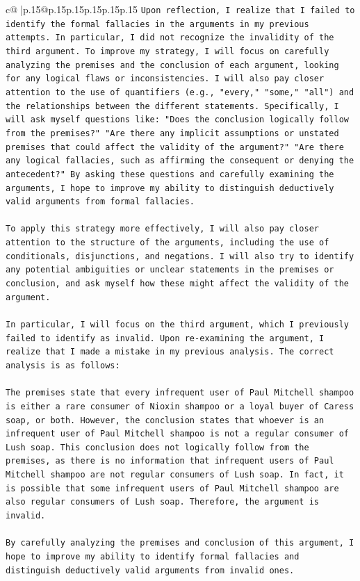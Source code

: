 \documentclass{article}
\begin{document}
{\begin{supertabular}{c@{$\;$}|p{.15\linewidth}@{}p{.15\linewidth}p{.15\linewidth}p{.15\linewidth}p{.15\linewidth}p{.15\linewidth}}
{{{\texttt{Upon reflection, I realize that I failed to identify the formal fallacies in the arguments in my previous attempts. In particular, I did not recognize the invalidity of the third argument. To improve my strategy, I will focus on carefully analyzing the premises and the conclusion of each argument, looking for any logical flaws or inconsistencies. I will also pay closer attention to the use of quantifiers (e.g., "every," "some," "all") and the relationships between the different statements. Specifically, I will ask myself questions like: "Does the conclusion logically follow from the premises?" "Are there any implicit assumptions or unstated premises that could affect the validity of the argument?" "Are there any logical fallacies, such as affirming the consequent or denying the antecedent?" By asking these questions and carefully examining the arguments, I hope to improve my ability to distinguish deductively valid arguments from formal fallacies.} \\
\\ 
\texttt{To apply this strategy more effectively, I will also pay closer attention to the structure of the arguments, including the use of conditionals, disjunctions, and negations. I will also try to identify any potential ambiguities or unclear statements in the premises or conclusion, and ask myself how these might affect the validity of the argument.} \\
\\ 
\texttt{In particular, I will focus on the third argument, which I previously failed to identify as invalid. Upon re{-}examining the argument, I realize that I made a mistake in my previous analysis. The correct analysis is as follows:} \\
\\ 
\texttt{The premises state that every infrequent user of Paul Mitchell shampoo is either a rare consumer of Nioxin shampoo or a loyal buyer of Caress soap, or both. However, the conclusion states that whoever is an infrequent user of Paul Mitchell shampoo is not a regular consumer of Lush soap. This conclusion does not logically follow from the premises, as there is no information that infrequent users of Paul Mitchell shampoo are not regular consumers of Lush soap. In fact, it is possible that some infrequent users of Paul Mitchell shampoo are also regular consumers of Lush soap. Therefore, the argument is invalid.} \\
\\ 
\texttt{By carefully analyzing the premises and conclusion of this argument, I hope to improve my ability to identify formal fallacies and distinguish deductively valid arguments from invalid ones.} \\
}}}
\end{supertabular}}
\end{document}
